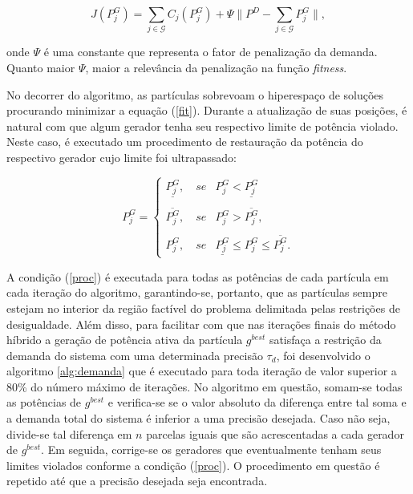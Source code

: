\documentclass[
	12pt,				%
	openany,			%
	twoside,			%
	a4paper,			%
	chapter=TITLE,		%
	section=Title,		%
	subsection=Title,	%
	subsubsection=Title,%
	english,			%
	french,				%
	spanish,			%
	brazil			%
	]{abntex2}
\begin{document}
\begin{ERRATA}
\begin{equation}\label{fit}
J(P^G_j) = \sum_{j \in \mathcal{G}}{C_j(P^G_j)} + \Psi \lVert P^D - \sum_{j \in \mathcal{G}}{P^G_j}\rVert,
\end{equation}

\noindent onde $\Psi$ é uma constante que representa o fator de penalização da demanda. Quanto maior $\Psi$, maior a relevância da penalização na função \emph{fitness}. 

No decorrer do algoritmo, as partículas sobrevoam o hiperespaço de soluções procurando minimizar a equação (\ref{fit}). Durante a atualização de suas posições, é natural com que algum gerador tenha seu respectivo limite de potência violado. Neste caso, é executado um procedimento de restauração da potência do respectivo gerador cujo limite foi ultrapassado:


\begin{equation}\label{proc}
P^G_j = \begin{cases}
\underline{P^G_j}, \quad se & P^G_j < \underline{P^G_j}\\\\
\overline{P^G_j}, \quad se & P^G_j > \overline{P^G_j},\\\\
P^G_j, \quad se &\underline{P^G_j} \leq P^G_j \leq \overline{P^G_j}.
\end{cases}
\end{equation}


A condição (\ref{proc}) é executada para todas as potências de cada partícula em cada iteração do algoritmo, garantindo-se, portanto, que as partículas sempre estejam no interior da região factível do problema delimitada pelas restrições de desigualdade. Além disso, para facilitar com que nas iterações finais do método híbrido a geração de potência ativa da partícula $g^{best}$ satisfaça a restrição da demanda do sistema com uma determinada precisão $\tau_d$, foi desenvolvido o algoritmo \ref{alg:demanda} que é executado para toda iteração de valor superior a 80\% do número máximo de iterações. No algoritmo em questão, somam-se todas as potências de $g^{best}$ e verifica-se se o valor absoluto da diferença entre tal soma e a demanda total do sistema é inferior a uma precisão desejada. Caso não seja, divide-se tal diferença em $n$ parcelas iguais que são acrescentadas a cada gerador de $g^{best}$. Em seguida, corrige-se os geradores que eventualmente tenham seus limites violados conforme a condição (\ref{proc}). O procedimento em questão é repetido até que a precisão desejada seja encontrada.



\end{ERRATA}
\end{document}
